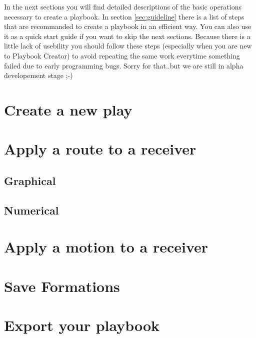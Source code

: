 \documentclass[10pt,a4paper]{article}
\begin{document}
		In the next sections you will find detailed descriptions of the basic operations necessary to create a playbook. In section \ref{sec:guideline} there is a list of steps that are recommanded to create a playbook in an efficient way. You can also use it as a quick start guide if you want to skip the next sections. Because there is a little lack of usebility you should follow these steps (especially when you are new to Playbook Creator) to avoid repeating the same work everytime something failed due to early programming bugs.
		Sorry for that..but we are still in alpha developement stage ;-)
	\clearpage
	\section{Create a new play}
	\section{Apply a route to a receiver}
	\label{sec:routes}
		\subsection{Graphical}
		\subsection{Numerical}
	\section{Apply a motion to a receiver}
	\section{Save Formations}
	\section{Export your playbook}
	\clearpage
\end{document}
